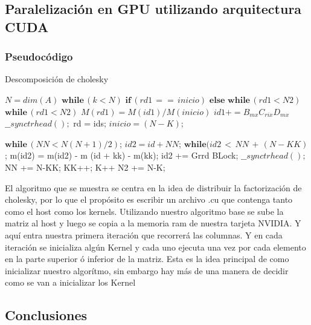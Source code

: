 \documentclass[12pt]{article}
\begin{document}
\subsection*{Paralelización en GPU utilizando arquitectura CUDA}

\subsubsection*{Pseudocódigo}

\begin{algorithm}
  \caption{Descomposición de cholesky}\label{Chol $n \times n}
  \begin{algorithmic}[1]
      \State $ N = dim(A)$
      \State $\mathbf{while} \, (k < N)$
      \State \qquad $\mathbf{if}\,( rd1 \,==\, inicio)$
      \State \qquad $\mathbf{else}$
      \State \qquad \qquad $\mathbf{while}\, (rd1 < N2)$
      \State \qquad \qquad \qquad $\mathbf{while}\, (rd1 < N2)$
      \State \qquad \qquad \qquad $M(rd1) = M(id1)/M(inicio)$ 
      \State \qquad \qquad \qquad $id1 += B_{mx}C_{rix}D_{mx}$
      \State  \qquad \qquad $\_ \_ synctrhead();$
      \State  \qquad rd = ids;
      \State \qquad$inicio = (N-K);$
      
      \State \qquad $\mathbf{while} \, (NN < N(N+1)/2)$;
      \State \qquad \qquad $id2 = id + NN$;
      \State \qquad \qquad $\mathbf{while}(id2 \, < \, NN \,+ \,(N-KK)$;
      \State \qquad \qquad \qquad m(id2) = m(id2) - m (id + kk) - m(kk);
      \State \qquad \qquad \qquad id2 += Grrd BLock;
      \State  \qquad \qquad $\_ \_ synctrhead();$
      \State  \qquad NN += N-KK;
      \State  \qquad KK++;
      \State K++
      \State N2 += N-K;
      
      \EndProcedure
  \end{algorithmic}
\end{algorithm}




El algoritmo que se muestra se centra en la idea de distribuir la factorización de cholesky, por lo que el propósito es escribir un archivo .cu que contenga tanto como el host como los kernels. Utilizando nuestro algoritmo base se sube la matriz al host y luego se copia a la memoria ram de nuestra tarjeta NVIDIA. Y aquí entra nuestra primera iteración que recorrerá las columnas. Y en cada iteración se inicializa algún Kernel y cada uno ejecuta una vez por cada elemento en la parte superior ó inferior de la matriz. Esta es la idea principal de como inicializar nuestro algorítmo, sin embargo hay más de una manera de decidir como se van a inicializar los Kernel   


\subsection*{Conclusiones}


\enddocument
\end{document}
